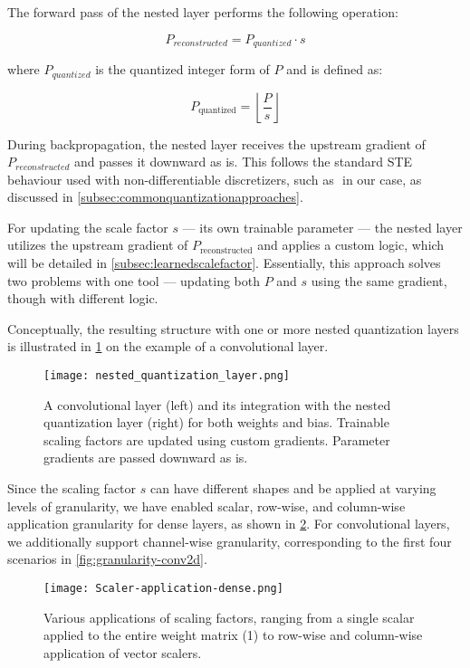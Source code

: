 The forward pass of the nested layer performs the following operation:

\[
  P_{reconstructed} = P_{quantized} \cdot s
\]

where \( P_{quantized} \) is the quantized integer form of \( P \) and is defined as:

\[
  P_{\text{quantized}} = \left\lfloor \frac{P}{s} \right\rfloor
\]

During backpropagation, the nested layer receives the upstream gradient of
\( P_{reconstructed} \) and passes it downward as is.  This follows the standard STE behaviour
used with non-differentiable discretizers, such as \(  \) in our case,
as discussed in \cref{subsec:commonquantizationapproaches}.

For updating the scale factor \( s \) — its own trainable parameter — 
the nested layer utilizes the upstream gradient of \( P_{\text{reconstructed}} \)
and applies a custom logic, which will be detailed in \cref{subsec:learnedscalefactor}. 
Essentially, this approach solves two problems with one tool — updating both 
\( P \) and \( s \) using the same gradient, though with different logic.

Conceptually, the resulting structure with one or more nested quantization layers is illustrated in \cref{fig:nested_quantization}
on the example of a convolutional layer.

\begin{figure}[h!]
  \centering
  \texttt{[image: nested\_quantization\_layer.png]}
  \caption{A convolutional layer (left) and its integration with the nested quantization layer (right) for both weights and bias.
  Trainable scaling factors are updated using custom gradients. Parameter gradients are passed downward as is.}
  \label{fig:nested_quantization}
\end{figure}

Since the scaling factor \( s \) can have different shapes and be applied at varying levels of granularity,
we have enabled scalar, row-wise, and column-wise application granularity for dense layers,
as shown in \cref{fig:scaler-application-dense}. 
For convolutional layers, we additionally support channel-wise granularity,
corresponding to the first four scenarios in \cref{fig:granularity-conv2d}.

\begin{figure}[b!]
  \centering
  \texttt{[image: Scaler-application-dense.png]}
  \caption{Various applications of scaling factors, ranging from a single scalar applied to the entire weight matrix (1) to row-wise and column-wise application of vector scalers.}
  \label{fig:scaler-application-dense}
\end{figure}

